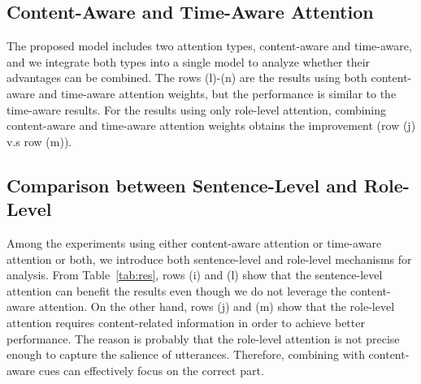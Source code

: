 \documentclass{article}
\begin{document}
\subsection{Content-Aware and Time-Aware Attention}
The proposed model includes two attention types, content-aware and time-aware, and we integrate both types into a single model to analyze whether their advantages can be combined.
The rows (l)-(n) are the results using both content-aware and time-aware attention weights, but the performance is similar to the time-aware results.
For the results using only role-level attention, combining content-aware and time-aware attention weights obtains the improvement (row (j) v.s row (m)). 

\subsection{Comparison between Sentence-Level and Role-Level}
\label{ssec:sent_role}
Among the experiments using either content-aware attention or time-aware attention or both, we introduce both sentence-level and role-level mechanisms for analysis. 
From Table~\ref{tab:res}, rows (i) and (l) show that the sentence-level attention can benefit the results even though we do not leverage the content-aware attention.
On the other hand, rows (j) and (m) show that the role-level attention requires content-related information in order to achieve better performance.
The reason is probably that the role-level attention is not precise enough to capture the salience of utterances.
Therefore, combining with content-aware cues can effectively focus on the correct part.

\end{document}
